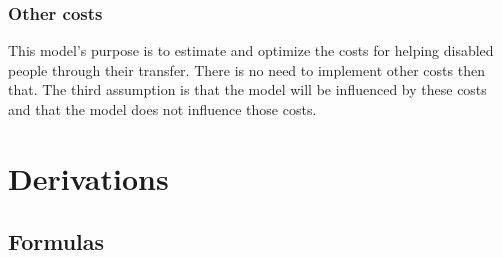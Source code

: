 \documentclass[a4paper, 11pt, notitlepage]{report}
\begin{document}
		\subsection{Other costs} This model's purpose is to estimate and optimize the costs for helping disabled people through their transfer. There is no need to implement other costs then that. The third assumption is that the model will be influenced by these costs and that the model does not influence those costs.
		
\chapter{Derivations}
	\section{Formulas}
\end{document}
